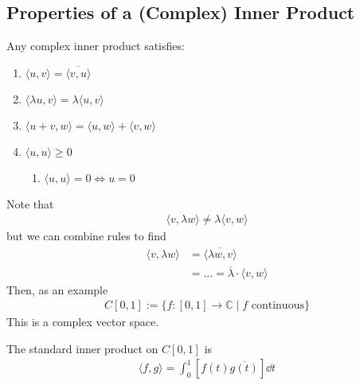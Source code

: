 \subsection{Properties of a (Complex) Inner Product}
\begin{definition}
    Any complex inner product satisfies:
    \begin{enumerate}
        \item $\langle u, v \rangle = \overline{\langle v, u \rangle}$
        \item $\langle \lambda u, v \rangle = \lambda \langle u, v \rangle$
        \item $\langle u + v, w \rangle = \langle u, w \rangle + \langle v, w \rangle$
        \item $\langle u, u \rangle \ge 0$
        \begin{enumerate}
            \item $\langle u, u \rangle = 0 \iff u = 0$
        \end{enumerate}
    \end{enumerate}
\end{definition}
Note that
\begin{align}
    \langle v, \lambda w \rangle \ne \lambda \langle v, w \rangle
\end{align}
but we can combine rules to find
\begin{align}
    \langle v, \lambda w \rangle &= \overline{
        \langle \lambda w, v \rangle
    }\\
    &= ... = \overline{\lambda} \cdot \langle v, w \rangle
\end{align}
Then, as an example
\begin{align}
    C[0,1] := \{ f: [0,1] \to \mathbb{C} \mid f \text{ continuous} \}
\end{align}
This is a complex vector space.
\begin{definition}
    The standard inner product on $C[0,1]$ is
    \begin{align}
        \langle f, g \rangle = \int_0^1 \left[ f(t) \overline{g(t)} \right] \dd{t}
    \end{align}
\end{definition}

